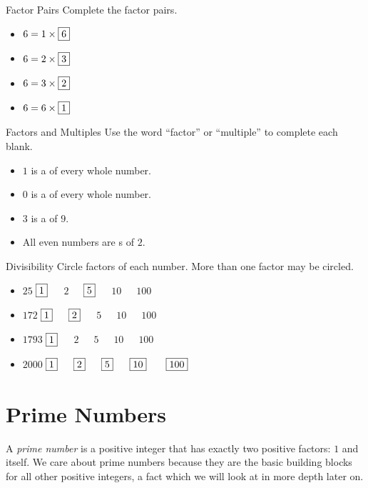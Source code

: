 \documentclass[a4paper,10pt]{report}
\begin{document}
\begin{problem}{Factor Pairs}
 Complete the factor pairs.

 \begin{itemize}
  \item \(6 = 1 \times \Ans{6}\)
  \item \(6 = 2 \times \Ans{3}\)
  \item \(6 = 3 \times \Ans{2}\)
  \item \(6 = 6 \times \Ans{1}\)
 \end{itemize}
\end{problem}

\begin{problem}{Factors and Multiples}
 Use the word ``factor'' or ``multiple'' to complete each blank.

 \begin{itemize}
  \item \(1\) is a  of every whole number.
  \item \(0\) is a  of every whole number.
  \item \(3\) is a  of \(9\).
  \item All even numbers are s of \(2\).
 \end{itemize}
\end{problem}

\begin{problem}{Divisibility}
 Circle factors of each number. More than one factor may be circled.

 \begin{itemize}
  \item \(25\) \hfill \(\Ans{1}\)~~~\(2\)~~~\(\Ans{5}\)~~~\(10\)~~~\(100\)
  \item \(172\) \hfill \(\Ans{1}\)~~~\(\Ans{2}\)~~~\(5\)~~~\(10\)~~~\(100\)
  \item \(1793\) \hfill \(\Ans{1}\)~~~\(2\)~~~\(5\)~~~\(10\)~~~\(100\)
  \item \(2000\) \hfill \(\Ans{1}\)~~~\(\Ans{2}\)~~~\(\Ans{5}\)~~~\(\Ans{10}\)
  ~~~\(\Ans{100}\)
 \end{itemize}
\end{problem}

\chapter{Prime Numbers}

A \emph{prime number} is a positive integer that has exactly two positive
factors: \(1\) and itself. We care about prime numbers because they are the
basic building blocks for all other positive integers, a fact which we will
look at in more depth later on.
\end{document}
